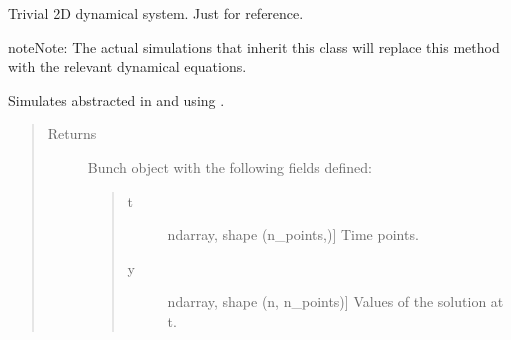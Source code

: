 \documentclass[a4paper,landscape,10pt,english]{sphinxmanual}
\begin{document}
\begin{fulllineitems}
\begin{fulllineitems}
\end{fulllineitems}


\begin{fulllineitems}
\label{\detokenize{code_docs/simulation_API.simulation:simulation_API.simulation.simulations.Simulation.dyn_sys_eqns}}
Trivial 2D dynamical system. Just for reference.

\begin{sphinxadmonition}{note}{Note:}
The actual simulations that inherit this class will replace this method
with the relevant dynamical equations.
\end{sphinxadmonition}

\end{fulllineitems}


\begin{fulllineitems}
\label{\detokenize{code_docs/simulation_API.simulation:simulation_API.simulation.simulations.Simulation.simulate}}
Simulates  abstracted in 
and using .
\begin{quote}\begin{description}
\item[{Returns}] \leavevmode

 \textendash{}

Bunch object with the following fields defined:
\begin{quote}
\begin{description}
\item[{t}] \leavevmode{[}ndarray, shape (n\_points,){]}
Time points.

\item[{y}] \leavevmode{[}ndarray, shape (n, n\_points){]}
Values of the solution at t.


\end{description}
\end{quote}
\end{description}
\end{quote}
\end{fulllineitems}
\end{fulllineitems}
\end{document}
